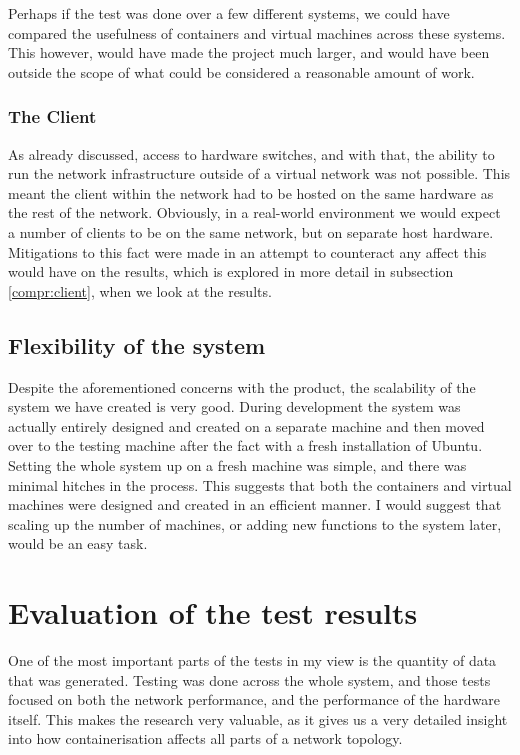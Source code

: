 Perhaps if the test was done over a few different systems, we could have compared the usefulness of containers and virtual machines across these systems. This however, would have made the project much larger, and would have been outside the scope of what could be considered a reasonable amount of work.

\subsection{The Client}
\label{ClientHardwareLimitation}
As already discussed, access to hardware switches, and with that, the ability to run the network infrastructure outside of a virtual network was not possible. This meant the client within the network had to be hosted on the same hardware as the rest of the network. Obviously, in a real-world environment we would expect a number of clients to be on the same network, but on separate host hardware. Mitigations to this fact were made in an attempt to counteract any affect this would have on the results, which is explored in more detail in subsection \ref{compr:client}, when we look at the results.

\section{Flexibility of the system}

Despite the aforementioned concerns with the product, the scalability of the system we have created is very good. During development the system was actually entirely designed and created on a separate machine and then moved over to the testing machine after the fact with a fresh installation of Ubuntu. Setting the whole system up on a fresh machine was simple, and there was minimal hitches in the process. This suggests that both the containers and virtual machines were designed and created in an efficient manner. I would suggest that scaling up the number of machines, or adding new functions to the system later, would be an easy task.







\chapter{Evaluation of the test results}
\label{chap:EvaluationTestResults}
One of the most important parts of the tests in my view is the quantity of data that was generated. Testing was done across the whole system, and those tests focused on both the network performance, and the performance of the hardware itself. This makes the research very valuable, as it gives us a very detailed insight into how containerisation affects all parts of a network topology.

